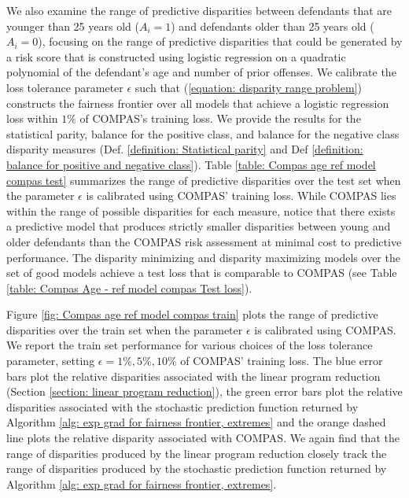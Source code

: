 \documentclass{article}
\begin{document}
We also examine the range of predictive disparities between defendants that are younger than 25 years old ($A_i = 1$) and defendants older than 25 years old ($A_i = 0$), focusing on the range of predictive disparities that could be generated by a risk score that is constructed using logistic regression on a quadratic polynomial of the defendant's age and number of prior offenses. We calibrate the loss tolerance parameter $\epsilon$ such that (\ref{equation: disparity range problem}) constructs the fairness frontier over all models that achieve a logistic regression loss within $1\%$ of COMPAS's training loss. We provide the results for the statistical parity, balance for the positive class, and balance for the negative class disparity measures (Def. \ref{definition: Statistical parity} and Def \ref{definition: balance for positive and negative class}).  Table \ref{table: Compas age ref model compas test} summarizes the range of predictive disparities over the test set when the parameter $\epsilon$ is calibrated using COMPAS' training loss. While COMPAS lies within the range of possible disparities for each measure, notice that there exists a predictive model that produces strictly smaller disparities between young and older defendants than the COMPAS risk assessment at minimal cost to predictive performance. The disparity minimizing and disparity maximizing models over the set of good models achieve a test loss that is comparable to COMPAS (see Table \ref{table: Compas Age - ref model compas Test loss}).

Figure \ref{fig: Compas age ref model compas train} plots the range of predictive disparities over the train set when the parameter $\epsilon$ is calibrated using COMPAS. We report the train set performance for various choices of the loss tolerance parameter, setting $\epsilon = 1\%, 5\%, 10\%$ of COMPAS' training loss. The blue error bars plot the relative disparities associated with the linear program reduction (Section \ref{section: linear program reduction}), the green error bars plot the relative disparities associated with the stochastic prediction function returned by Algorithm \ref{alg: exp grad for fairness frontier, extremes} and the orange dashed line plots the relative disparity associated with COMPAS. We again find that the range of disparities produced by the linear program reduction closely track the range of disparities produced by the stochastic prediction function returned by Algorithm \ref{alg: exp grad for fairness frontier, extremes}.
\end{document}
